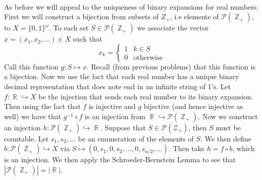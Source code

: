 \documentclass{article}
\DeclareMathOperator{\Z}{\mathbb{Z}}
\DeclareMathOperator{\R}{\mathbb{R}}
\DeclareMathOperator{\into}{\hookrightarrow}
\newcommand{\problem}[1]{\noindent{\textbf{Problem #1}}\\}
\begin{document}
\problem{1.9.8} As before we will appeal to the uniqueness of binary expansions for real numbers. First we will construct a bijection from subsets of $Z_+$, i.e elements of $\mathcal{P}(\Z_+)$, to $X = \{0,1\}^\omega$. To each set $S \in \mathcal{P}(\Z_+)$ we associate the vector $x = (x_1,x_2,\ldots) \in X$ such that
\[
x_k = 
\begin{cases}
1 & k\in S \\
0 & \text{otherwise}
\end{cases}
\]
Call this function $g: S \mapsto x$. Recall (from previous problems) that this function is a bijection. Now we use the fact that each real number has a unique binary decimal representation that does note end in an infinite string of 1's. Let $f: \R \into X$ be the injection that sends each real number to its binary expansion.  Then using the fact that $f$ is injective and $g$ bijective (and hence injective as well) we have that $g^{-1} \circ f$ is an injection from $\R \into \mathcal{P}(\Z_+)$. Now we construct an injection $h: \mathcal{P}(\Z_+) \into \R$. Suppose that $S \in \mathcal{P}(\mathcal{Z_+})$, then $S$ must be countable. Let $s_1,s_2,\ldots$ be an enumeration of the elements of $S$. We then define $b: \mathcal{P}(\Z_+) \into X$ via $S \mapsto (0, s_1, 0, s_2, \ldots, 0, s_{n/2},\ldots)$. Then take $h = f \circ b$, which is an injection. We then apply the Schroeder-Bernstein Lemma to see that $|\mathcal{P}(\Z_+)| = |\R|$. 
\end{document}
